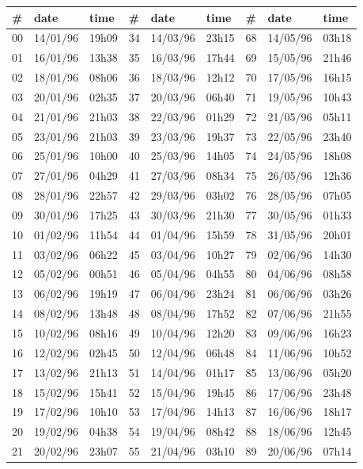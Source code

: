 \documentclass{tufte-handout}
\begin{document}
\begin{table}
\begin{tabular}{lll|lll|lll}
\# & date & time & \# & date & time & \# & date & time \\ \hline
00 & 14/01/96 & 19h09 & 34 & 14/03/96 & 23h15 & 68 & 14/05/96 & 03h18\\
01 & 16/01/96 & 13h38 & 35 & 16/03/96 & 17h44 & 69 & 15/05/96 & 21h46\\
02 & 18/01/96 & 08h06 & 36 & 18/03/96 & 12h12 & 70 & 17/05/96 & 16h15\\
03 & 20/01/96 & 02h35 & 37 & 20/03/96 & 06h40 & 71 & 19/05/96 & 10h43\\
04 & 21/01/96 & 21h03 & 38 & 22/03/96 & 01h29 & 72 & 21/05/96 & 05h11\\
05 & 23/01/96 & 21h03 & 39 & 23/03/96 & 19h37 & 73 & 22/05/96 & 23h40\\
06 & 25/01/96 & 10h00 & 40 & 25/03/96 & 14h05 & 74 & 24/05/96 & 18h08\\
07 & 27/01/96 & 04h29 & 41 & 27/03/96 & 08h34 & 75 & 26/05/96 & 12h36\\
08 & 28/01/96 & 22h57 & 42 & 29/03/96 & 03h02 & 76 & 28/05/96 & 07h05\\
09 & 30/01/96 & 17h25 & 43 & 30/03/96 & 21h30 & 77 & 30/05/96 & 01h33\\
10 & 01/02/96 & 11h54 & 44 & 01/04/96 & 15h59 & 78 & 31/05/96 & 20h01\\
11 & 03/02/96 & 06h22 & 45 & 03/04/96 & 10h27 & 79 & 02/06/96 & 14h30\\
12 & 05/02/96 & 00h51 & 46 & 05/04/96 & 04h55 & 80 & 04/06/96 & 08h58\\
13 & 06/02/96 & 19h19 & 47 & 06/04/96 & 23h24 & 81 & 06/06/96 & 03h26\\
14 & 08/02/96 & 13h48 & 48 & 08/04/96 & 17h52 & 82 & 07/06/96 & 21h55\\
15 & 10/02/96 & 08h16 & 49 & 10/04/96 & 12h20 & 83 & 09/06/96 & 16h23\\
16 & 12/02/96 & 02h45 & 50 & 12/04/96 & 06h48 & 84 & 11/06/96 & 10h52\\
17 & 13/02/96 & 21h13 & 51 & 14/04/96 & 01h17 & 85 & 13/06/96 & 05h20\\
18 & 15/02/96 & 15h41 & 52 & 15/04/96 & 19h45 & 86 & 17/06/96 & 23h48\\
19 & 17/02/96 & 10h10 & 53 & 17/04/96 & 14h13 & 87 & 16/06/96 & 18h17\\
20 & 19/02/96 & 04h38 & 54 & 19/04/96 & 08h42 & 88 & 18/06/96 & 12h45\\
21 & 20/02/96 & 23h07 & 55 & 21/04/96 & 03h10 & 89 & 20/06/96 & 07h14\\

\end{tabular}
\end{table}
\end{document}
